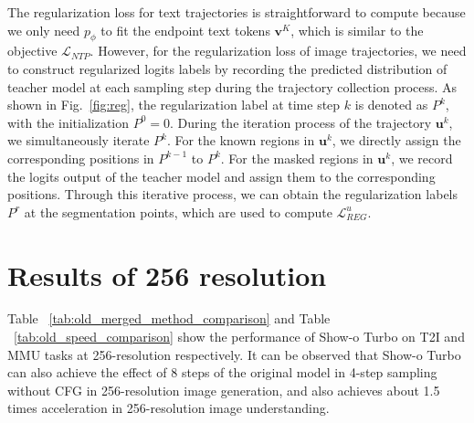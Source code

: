 The regularization loss for text trajectories is straightforward to compute because we only need $p_\phi$ to fit the endpoint text tokens $\mathbf{v}^K$, which is similar to the objective $\mathcal{L}_{NTP}$. 
However, for the regularization loss of image trajectories, we need to construct regularized logits labels by recording the predicted distribution of teacher model at each sampling step during the trajectory collection process. 
As shown in Fig.~\ref{fig:reg}, the regularization label at time step $k$ is denoted as $P^k$, with the initialization $P^0=0$. 
During the iteration process of the trajectory $\mathbf{u}^k$, we simultaneously iterate $P^k$. For the known regions in $\mathbf{u}^k$, we directly assign the corresponding positions in $P^{k-1}$ to $P^k$. For the masked regions in $\mathbf{u}^k$, we record the logits output of the teacher model and assign them to the corresponding positions. Through this iterative process, we can obtain the regularization labels $P^r$ at the segmentation points, which are used to compute $\mathcal{L}_{REG}^u$.






\section{Results of 256 resolution}
Table ~\ref{tab:old_merged_method_comparison} and Table ~\ref{tab:old_speed_comparison} show the performance of Show-o Turbo on T2I and MMU tasks at 256-resolution respectively. 
It can be observed that Show-o Turbo can also achieve the effect of 8 steps of the original model in 4-step sampling without CFG in 256-resolution image generation, 
and also achieves about 1.5 times acceleration in 256-resolution image understanding.

